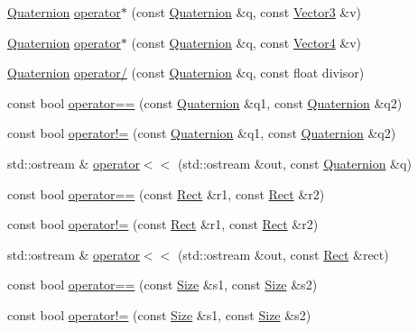 \begin{DoxyCompactItemize}
\hyperlink{classprism_1_1_quaternion}{Quaternion} \hyperlink{namespaceprism_a8aebd3615ba448915f37140515a37b05}{operator$\ast$} (const \hyperlink{classprism_1_1_quaternion}{Quaternion} \&q, const \hyperlink{classprism_1_1_vector3}{Vector3} \&v)
\item 
\hyperlink{classprism_1_1_quaternion}{Quaternion} \hyperlink{namespaceprism_a2c4c5e120d8c4de9891f2261a50f100e}{operator$\ast$} (const \hyperlink{classprism_1_1_quaternion}{Quaternion} \&q, const \hyperlink{classprism_1_1_vector4}{Vector4} \&v)
\item 
\hyperlink{classprism_1_1_quaternion}{Quaternion} \hyperlink{namespaceprism_aec648937a53338bcd9879670877d0425}{operator/} (const \hyperlink{classprism_1_1_quaternion}{Quaternion} \&q, const float divisor)
\item 
const bool \hyperlink{namespaceprism_ac4ae112433b9ab32c801cccc9c3f74f0}{operator==} (const \hyperlink{classprism_1_1_quaternion}{Quaternion} \&q1, const \hyperlink{classprism_1_1_quaternion}{Quaternion} \&q2)
\item 
const bool \hyperlink{namespaceprism_a9e32551f997ae19dc52df146482405c1}{operator!=} (const \hyperlink{classprism_1_1_quaternion}{Quaternion} \&q1, const \hyperlink{classprism_1_1_quaternion}{Quaternion} \&q2)
\item 
std\+::ostream \& \hyperlink{namespaceprism_ad2beaed7a837821f0abc608cf6ac6c0f}{operator$<$$<$} (std\+::ostream \&out, const \hyperlink{classprism_1_1_quaternion}{Quaternion} \&q)
\item 
const bool \hyperlink{namespaceprism_abe409fa2ef458a2d477ed7845cf4b6a6}{operator==} (const \hyperlink{classprism_1_1_rect}{Rect} \&r1, const \hyperlink{classprism_1_1_rect}{Rect} \&r2)
\item 
const bool \hyperlink{namespaceprism_ad9f46c5ebd3cec844925173aaacbed9f}{operator!=} (const \hyperlink{classprism_1_1_rect}{Rect} \&r1, const \hyperlink{classprism_1_1_rect}{Rect} \&r2)
\item 
std\+::ostream \& \hyperlink{namespaceprism_a52fd2a97b66b06ba6e451e1890136ff4}{operator$<$$<$} (std\+::ostream \&out, const \hyperlink{classprism_1_1_rect}{Rect} \&rect)
\item 
const bool \hyperlink{namespaceprism_a2a7baeb09cd2ee29251667ad18a2bd00}{operator==} (const \hyperlink{classprism_1_1_size}{Size} \&s1, const \hyperlink{classprism_1_1_size}{Size} \&s2)
\item 
const bool \hyperlink{namespaceprism_a63ab3c18ecc73e21e7281dbe180e07e8}{operator!=} (const \hyperlink{classprism_1_1_size}{Size} \&s1, const \hyperlink{classprism_1_1_size}{Size} \&s2)

\end{DoxyCompactItemize}
